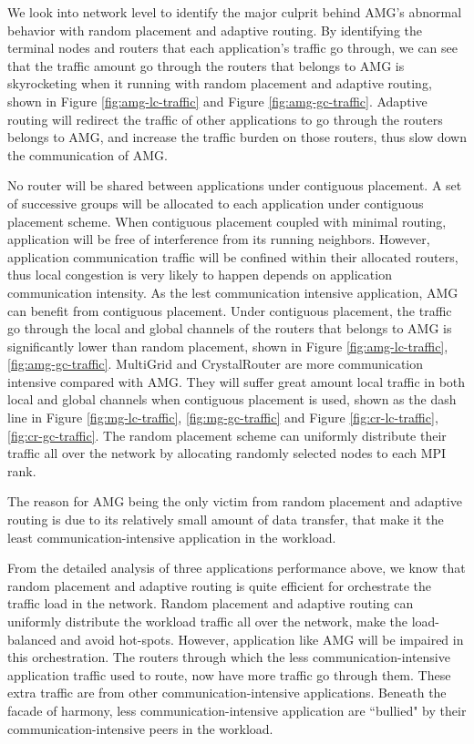 \documentclass[conference,compsoc]{IEEEtran}
\begin{document}
We look into network level to identify the major culprit behind AMG's abnormal behavior with random placement and adaptive routing. By identifying the terminal nodes and routers that each application's traffic go through, we can see that the traffic amount go through the routers that belongs to AMG is skyrocketing when it running with random placement and adaptive routing, shown in Figure \ref{fig:amg-lc-traffic} and Figure \ref{fig:amg-gc-traffic}. Adaptive routing will redirect the traffic of other applications to go through the routers belongs to AMG, and increase the traffic burden on those routers, thus slow down the communication of AMG.

No router will be shared between applications under contiguous placement. A set of successive groups will be allocated to each application under contiguous placement scheme. When contiguous placement coupled with minimal routing, application will be free of interference from its running neighbors. However, application communication traffic will be confined within their allocated routers, thus local congestion is very likely to happen depends on application communication intensity. As the lest communication intensive application, AMG can benefit from contiguous placement. Under contiguous placement, the traffic go through the local and global channels of the routers that belongs to AMG is significantly lower than random placement, shown in Figure \ref{fig:amg-lc-traffic}, \ref{fig:amg-gc-traffic}. MultiGrid and CrystalRouter are more communication intensive compared with AMG. They will suffer great amount local traffic in both local and global channels when contiguous placement is used, shown as the dash line in Figure \ref{fig:mg-lc-traffic}, \ref{fig:mg-gc-traffic} and Figure \ref{fig:cr-lc-traffic}, \ref{fig:cr-gc-traffic}. The random placement scheme can uniformly distribute their traffic all over the network by allocating randomly selected nodes to each MPI rank. 

The reason for AMG being the only victim from random placement and adaptive routing is due to  its relatively small amount of data transfer, that make it the least communication-intensive application in the workload.

From the detailed analysis of three applications performance above, we know that random placement and adaptive routing is quite efficient for orchestrate the traffic load in the network. Random placement and adaptive routing can uniformly distribute the workload traffic all over the network, make the load-balanced and avoid hot-spots. However, application like AMG will be impaired in this orchestration. The routers through which the less communication-intensive application traffic used to route, now have more traffic go through them. These extra traffic are from other communication-intensive applications. Beneath the facade of harmony, less communication-intensive application are ``bullied" by their communication-intensive peers in the workload. 
\end{document}
